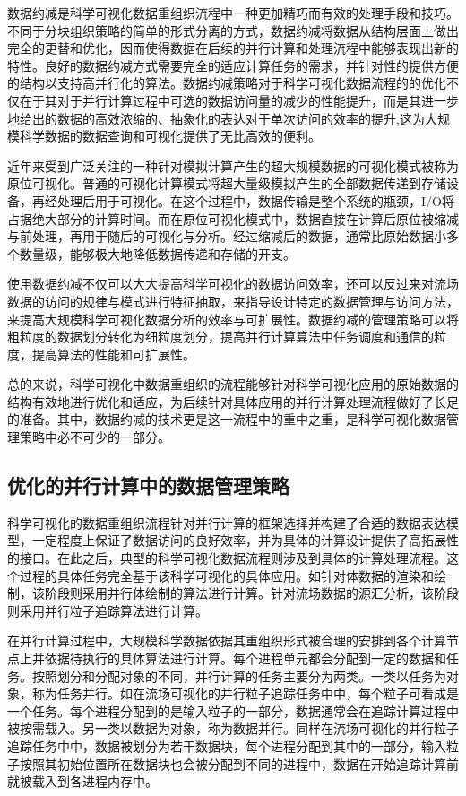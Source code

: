数据约减是科学可视化数据重组织流程中一种更加精巧而有效的处理手段和技巧。不同于分块组织策略的简单的形式分离的方式，数据约减将数据从结构层面上做出完全的更替和优化，因而使得数据在后续的并行计算和处理流程中能够表现出新的特性。良好的数据约减方式需要完全的适应计算任务的需求，并针对性的提供方便的结构以支持高并行化的算法。数据约减策略对于科学可视化数据流程的的优化不仅在于其对于并行计算过程中可选的数据访问量的减少的性能提升，而是其进一步地给出的数据的高效浓缩的、抽象化的表达对于单次访问的效率的提升,这为大规模科学数据的数据查询和可视化提供了无比高效的便利。

近年来受到广泛关注的一种针对模拟计算产生的超大规模数据的可视化模式被称为原位可视化。普通的可视化计算模式将超大量级模拟产生的全部数据传递到存储设备，再经处理后用于可视化。在这个过程中，数据传输是整个系统的瓶颈，I/O将占据绝大部分的计算时间。而在原位可视化模式中，数据直接在计算后原位被缩减与前处理，再用于随后的可视化与分析。经过缩减后的数据，通常比原始数据小多个数量级，能够极大地降低数据传递和存储的开支。

使用数据约减不仅可以大大提高科学可视化的数据访问效率，还可以反过来对流场数据的访问的规律与模式进行特征抽取，来指导设计特定的数据管理与访问方法，来提高大规模科学可视化数据分析的效率与可扩展性。数据约减的管理策略可以将粗粒度的数据划分转化为细粒度划分，提高并行计算算法中任务调度和通信的粒度，提高算法的性能和可扩展性。

总的来说，科学可视化中数据重组织的流程能够针对科学可视化应用的原始数据的结构有效地进行优化和适应，为后续针对具体应用的并行计算处理流程做好了长足的准备。其中，数据约减的技术更是这一流程中的重中之重，是科学可视化数据管理策略中必不可少的一部分。

\subsection{优化的并行计算中的数据管理策略}
科学可视化的数据重组织流程针对并行计算的框架选择并构建了合适的数据表达模型，一定程度上保证了数据访问的良好效率，并为具体的计算设计提供了高拓展性的接口。在此之后，典型的科学可视化数据流程则涉及到具体的计算处理流程。这个过程的具体任务完全基于该科学可视化的具体应用。如针对体数据的渲染和绘制，该阶段则采用并行体绘制的算法进行计算。针对流场数据的源汇分析，该阶段则采用并行粒子追踪算法进行计算。

在并行计算过程中，大规模科学数据依据其重组织形式被合理的安排到各个计算节点上并依据待执行的具体算法进行计算。每个进程单元都会分配到一定的数据和任务。按照划分和分配对象的不同，并行计算的任务主要分为两类。一类以任务为对象，称为任务并行。如在流场可视化的并行粒子追踪任务中中，每个粒子可看成是一个任务。每个进程分配到的是输入粒子的一部分，数据通常会在追踪计算过程中被按需载入。另一类以数据为对象，称为数据并行。同样在流场可视化的并行粒子追踪任务中中，数据被划分为若干数据块，每个进程分配到其中的一部分，输入粒子按照其初始位置所在数据块也会被分配到不同的进程中，数据在开始追踪计算前就被载入到各进程内存中。


